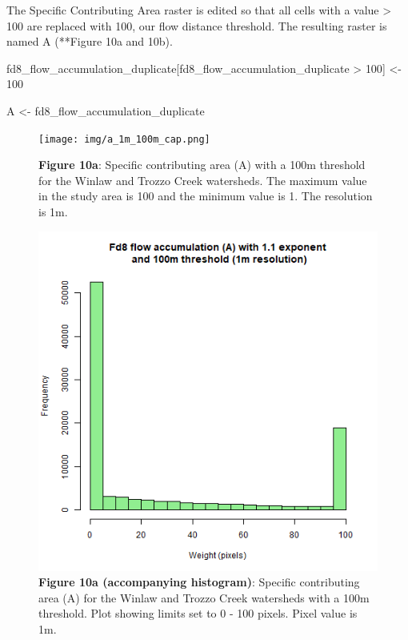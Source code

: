 \documentclass[
]{article}
\newenvironment{Shaded}{\begin{snugshade}}{\end{snugshade}}
\newcommand{\DecValTok}[1]{\textcolor[rgb]{0.00,0.00,0.81}{#1}}
\newcommand{\NormalTok}[1]{#1}
\newcommand{\OtherTok}[1]{\textcolor[rgb]{0.56,0.35,0.01}{#1}}
\newcommand{\SpecialCharTok}[1]{\textcolor[rgb]{0.00,0.00,0.00}{#1}}
\begin{document}
The Specific Contributing Area raster is edited so that all cells with a value \textgreater{} 100 are replaced with 100, our flow distance threshold. The resulting raster is named A (**Figure 10a and 10b).

\begin{Shaded}
\begin{Highlighting}[]
\NormalTok{fd8\_flow\_accumulation\_duplicate[fd8\_flow\_accumulation\_duplicate }\SpecialCharTok{\textgreater{}} \DecValTok{100}\NormalTok{] }\OtherTok{\textless{}{-}} \DecValTok{100}

\NormalTok{A }\OtherTok{\textless{}{-}}\NormalTok{ fd8\_flow\_accumulation\_duplicate}
\end{Highlighting}
\end{Shaded}

\begin{figure}
\centering
\texttt{[image: img/a\_1m\_100m\_cap.png]}
\caption{\textbf{Figure 10a}: Specific contributing area (A) with a 100m threshold for the Winlaw and Trozzo Creek watersheds. The maximum value in the study area is 100 and the minimum value is 1. The resolution is 1m.}
\end{figure}

\begin{figure}
\centering
\includegraphics{img/A_1m_hist.png}
\caption{\textbf{Figure 10a (accompanying histogram)}: Specific contributing area (A) for the Winlaw and Trozzo Creek watersheds with a 100m threshold. Plot showing limits set to 0 - 100 pixels. Pixel value is 1m.}
\end{figure}
\end{document}
